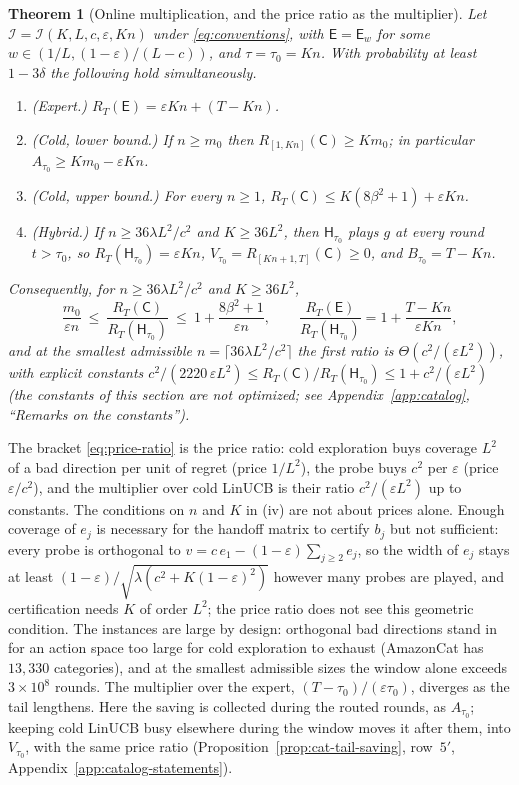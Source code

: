 \documentclass{article}
\newtheorem{theorem}{Theorem}
\theoremstyle{definition}
\theoremstyle{remark}
\newcommand{\eps}{\varepsilon}
\theoremstyle{remark}
\newcommand{\Cold}{\mathsf{C}}
\newcommand{\Exp}{\mathsf{E}}
\newcommand{\Hyb}{\mathsf{H}}
\begin{document}
\begin{theorem}[Online multiplication, and the price ratio as the multiplier]
\label{thm:price}
Let $\mathcal I=\mathcal I(K,L,c,\eps,Kn)$ under \eqref{eq:conventions}, with
$\Exp=\Exp_w$ for some $w\in(1/L,(1-\eps)/(L-c))$, and $\tau=\tau_0=Kn$. With
probability at least $1-3\delta$ the following hold simultaneously.
\begin{enumerate}[itemsep=1pt,topsep=1pt,leftmargin=*]
\item[(i)] \emph{(Expert.)} $R_T(\Exp)=\eps Kn+(T-Kn)$.
\item[(ii)] \emph{(Cold, lower bound.)} If $n\ge m_0$ then
$R_{[1,Kn]}(\Cold)\ge Km_0$; in particular $A_{\tau_0}\ge Km_0-\eps Kn$.
\item[(iii)] \emph{(Cold, upper bound.)} For every $n\ge1$, $R_T(\Cold)\le K(8\beta^2+1)+\eps Kn$.
\item[(iv)] \emph{(Hybrid.)} If $n\ge36\lambda L^2/c^2$ and $K\ge36L^2$, then
$\Hyb_{\tau_0}$ plays $g$ at every round $t>\tau_0$, so
$R_T(\Hyb_{\tau_0})=\eps Kn$, $V_{\tau_0}=R_{[Kn+1,T]}(\Cold)\ge0$, and
$B_{\tau_0}=T-Kn$.
\end{enumerate}
Consequently, for $n\ge36\lambda L^2/c^2$ and $K\ge36L^2$,
\begin{equation}
\label{eq:price-ratio}
\frac{m_0}{\eps n}\ \le\ \frac{R_T(\Cold)}{R_T(\Hyb_{\tau_0})}\ \le\ 1+\frac{8\beta^2+1}{\eps n},
\qquad
\frac{R_T(\Exp)}{R_T(\Hyb_{\tau_0})}=1+\frac{T-Kn}{\eps Kn},
\end{equation}
and at the smallest admissible $n=\lceil36\lambda L^2/c^2\rceil$ the first
ratio is $\Theta(c^2/(\eps L^2))$, with explicit constants
$c^2/(2220\,\eps L^2)\le R_T(\Cold)/R_T(\Hyb_{\tau_0})\le1+c^2/(\eps L^2)$
(the constants of this section are not optimized; see
Appendix~\ref{app:catalog}, ``Remarks on the constants'').
\end{theorem}

The bracket \eqref{eq:price-ratio} is the price ratio: cold exploration buys
coverage $L^2$ of a bad direction per unit of regret (price $1/L^2$), the
probe buys $c^2$ per $\eps$ (price $\eps/c^2$), and the multiplier over cold
LinUCB is their ratio $c^2/(\eps L^2)$ up to constants. The conditions on
$n$ and $K$ in (iv) are not about prices alone. Enough coverage of $e_j$ is
necessary for the handoff matrix to certify $b_j$ but not sufficient: every
probe is orthogonal to $v=c\,e_1-(1-\eps)\sum_{j\ge2}e_j$, so the width of
$e_j$ stays at least $(1-\eps)/\sqrt{\lambda(c^2+K(1-\eps)^2)}$ however many
probes are played, and certification needs $K$ of order $L^2$; the price
ratio does not see this geometric condition. The instances are large by
design: orthogonal bad directions stand in for an action space too large for
cold exploration to exhaust (AmazonCat has $13{,}330$ categories), and at the
smallest admissible sizes the window alone exceeds $3\times10^8$ rounds. The multiplier over
the expert, $(T-\tau_0)/(\eps\tau_0)$, diverges as the tail lengthens. Here
the saving is collected during the routed rounds, as $A_{\tau_0}$; keeping
cold LinUCB busy elsewhere during the window moves it after them, into
$V_{\tau_0}$, with the same price ratio (Proposition~\ref{prop:cat-tail-saving},
row~$5'$, Appendix~\ref{app:catalog-statements}).
\end{document}
